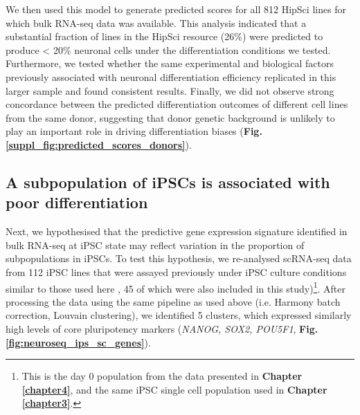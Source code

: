We then used this model to generate predicted scores for all 812 HipSci lines for which bulk RNA-seq data was available.
This analysis indicated that a substantial fraction of lines in the HipSci resource (26\%) were predicted to produce < 20\% neuronal cells under the differentiation conditions we tested.
Furthermore, we tested whether the same experimental and biological factors previously associated with neuronal differentiation efficiency replicated in this larger sample and found consistent results.
Finally, we did not observe strong concordance between the predicted differentiation outcomes of different cell lines from the same donor, suggesting that donor genetic background is unlikely to play an important role in driving differentiation biases (\textbf{Fig. \ref{suppl_fig:predicted_scores_donors}}).


\newpage

\subsection{A subpopulation of iPSCs is associated with poor differentiation}

Next, 
we hypothesised that the predictive gene expression signature identified in bulk RNA-seq at iPSC state may reflect variation in the proportion of subpopulations in iPSCs. 
To test this hypothesis, we re-analysed scRNA-seq data from 112 iPSC lines that were assayed previously under iPSC culture conditions similar to those used here \cite{cuomo2020single}, 45 of which were also included in this study)\footnote{This is the day 0 population from the data presented in \textbf{Chapter \ref{chapter4}}, and the same iPSC single cell population used in \textbf{Chapter \ref{chapter3}}.}. 
After processing the data using the same pipeline as used above (i.e. Harmony batch correction, Louvain clustering),
we identified 5 clusters, 
which expressed similarly high levels of core pluripotency markers (\textit{NANOG, SOX2, POU5F1}, \textbf{Fig. \ref{fig:neuroseq_ips_sc_genes}}). \\

